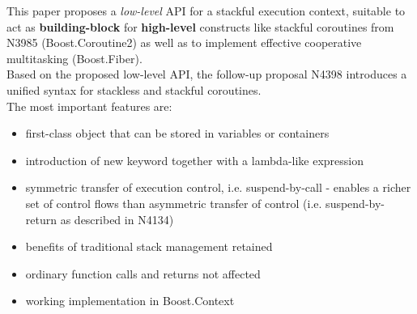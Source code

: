 This paper proposes a \emph{low-level} API for a stackful execution context,
suitable to act as {\bfseries building-block} for {\bfseries high-level}
constructs like stackful coroutines from N3985\cite{N3985}
(Boost.Coroutine2\cite{bcoroutine2}) as well as to implement effective
cooperative multitasking (Boost.Fiber\cite{bfiber}).\\
Based on the proposed low-level API, the follow-up proposal N4398\cite{N4398}
introduces a unified syntax for stackless and stackful coroutines.\\
\newline
The most important features are:
\begin{itemize}
    \item first-class object that can be stored in variables or containers
    \item introduction of new keyword \resumable together with a lambda-like
          expression
    \item symmetric transfer of execution control, i.e. suspend-by-call -
          enables a richer set of control flows than asymmetric transfer of
          control (i.e. suspend-by-return as described in N4134)
    \item benefits of traditional stack management retained
    \item ordinary function calls and returns not affected
    \item working implementation in Boost.Context\cite{bcontext}
\end{itemize}
